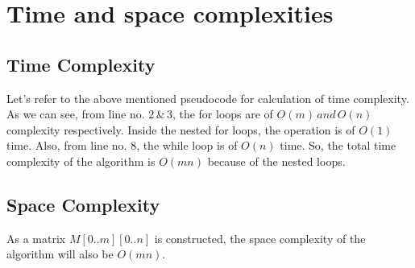 \documentclass{article}
\begin{document}
    \pagebreak
  \section{Time and space complexities}
  
    \subsection{Time Complexity}
    Let's refer to the above mentioned pseudocode for calculation of time complexity.
    As we can see, from line no. $2\,\&\,3$, the for loops are of $O(m)\,and\,O(n)$
    complexity respectively. Inside the nested for loops, the operation is of 
    $O(1)$ time. Also, from line no. $8$, the while loop is of $O(n)$ time. So, the 
    total time complexity of the algorithm is $O(mn)$ because of the nested loops.
    
    \subsection{Space Complexity}
    As a matrix $M[0..m][0..n]$ is constructed, the space complexity of the algorithm 
    will also be $O(mn)$.\\
    
\end{document}
